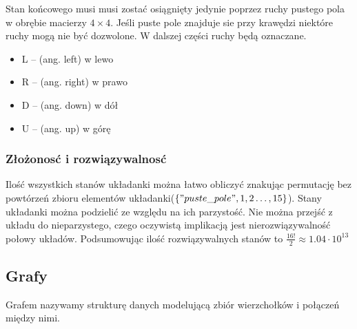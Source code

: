 \documentclass{classrep}
\begin{document}
Stan końcowego musi musi zostać osiągnięty jedynie poprzez ruchy pustego pola w obrębie macierzy $4\times 4$. 
Jeśli puste pole znajduje sie przy krawędzi niektóre ruchy mogą nie być dozwolone.
W dalszej części ruchy będą oznaczane.
\begin{itemize}
    \item L -- (ang. left) w lewo
    \item R -- (ang. right) w prawo
    \item D -- (ang. down) w dół
    \item U -- (ang. up) w górę
\end{itemize}
\subsubsection{Złożonosć i rozwiązywalnosć}
Ilość wszystkich stanów układanki można łatwo obliczyć znakując permutację bez powtórzeń zbioru elementów układanki($\{"puste\_pole",1,2\dots,15\}$).
Stany układanki można podzielić ze względu na ich parzystość.
Nie można przejść z układu do nieparzystego, czego oczywistą implikacją jest nierozwiązywalność połowy układów\cite{15parity}.
Podsumowując ilość rozwiązywalnych stanów to $\frac{16!}{2}\approx 1.04\cdot10^{13}$  
\subsection{Grafy}
Grafem nazywamy strukturę danych modelującą zbiór wierzchołków i połączeń między nimi.
\end{document}
